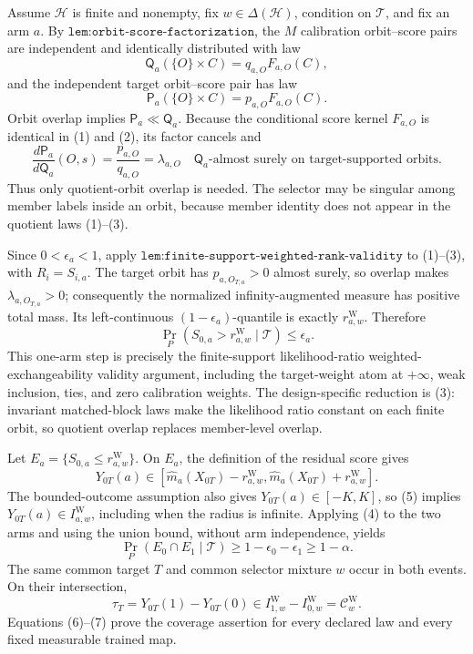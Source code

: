 Assume \(\mathcal H\) is finite and nonempty, fix \(w\in\Delta(\mathcal H)\), condition on \(\mathcal T\), and fix an arm \(a\). By \(\texttt{lem:orbit-score-factorization}\), the \(M\) calibration orbit--score pairs are independent and identically distributed with law
\[
\mathsf Q_a(\{O\}\times C)=q_{a,O}F_{a,O}(C),
\tag{1}
\]
and the independent target orbit--score pair has law
\[
\mathsf P_a(\{O\}\times C)=p_{a,O}F_{a,O}(C).
\tag{2}
\]
Orbit overlap implies \(\mathsf P_a\ll\mathsf Q_a\). Because the conditional score kernel \(F_{a,O}\) is identical in (1) and (2), its factor cancels and
\[
\frac{d\mathsf P_a}{d\mathsf Q_a}(O,s)=\frac{p_{a,O}}{q_{a,O}}=\lambda_{a,O}
\quad\mathsf Q_a\text{-almost surely on target-supported orbits}.
\tag{3}
\]
Thus only quotient-orbit overlap is needed. The selector may be singular among member labels inside an orbit, because member identity does not appear in the quotient laws (1)--(3).

Since \(0<\epsilon_a<1\), apply \(\texttt{lem:finite-support-weighted-rank-validity}\) to (1)--(3), with \(R_i=S_{i,a}\). The target orbit has \(p_{a,O_{T,a}}>0\) almost surely, so overlap makes \(\lambda_{a,O_{T,a}}>0\); consequently the normalized infinity-augmented measure has positive total mass. Its left-continuous \((1-\epsilon_a)\)-quantile is exactly \(r^{\mathrm W}_{a,w}\). Therefore
\[
\Pr_P\!\left(S_{0,a}>r^{\mathrm W}_{a,w}\mid\mathcal T\right)\le\epsilon_a.
\tag{4}
\]
This one-arm step is precisely the finite-support likelihood-ratio weighted-exchangeability validity argument, including the target-weight atom at \(+\infty\), weak inclusion, ties, and zero calibration weights. The design-specific reduction is (3): invariant matched-block laws make the likelihood ratio constant on each finite orbit, so quotient overlap replaces member-level overlap.

Let \(E_a=\{S_{0,a}\le r^{\mathrm W}_{a,w}\}\). On \(E_a\), the definition of the residual score gives
\[
Y_{0T}(a)\in[\widehat m_a(X_{0T})-r^{\mathrm W}_{a,w},\widehat m_a(X_{0T})+r^{\mathrm W}_{a,w}].
\tag{5}
\]
The bounded-outcome assumption also gives \(Y_{0T}(a)\in[-K,K]\), so (5) implies \(Y_{0T}(a)\in I^{\mathrm W}_{a,w}\), including when the radius is infinite. Applying (4) to the two arms and using the union bound, without arm independence, yields
\[
\Pr_P(E_0\cap E_1\mid\mathcal T)\ge1-\epsilon_0-\epsilon_1\ge1-\alpha.
\tag{6}
\]
The same common target \(T\) and common selector mixture \(w\) occur in both events. On their intersection,
\[
\tau_T=Y_{0T}(1)-Y_{0T}(0)\in I^{\mathrm W}_{1,w}-I^{\mathrm W}_{0,w}=\mathcal C^{\mathrm W}_w.
\tag{7}
\]
Equations (6)--(7) prove the coverage assertion for every declared law and every fixed measurable trained map.

